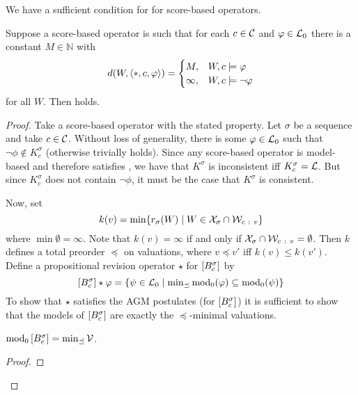 We have a sufficient condition for \agm{} for score-based operators.

\begin{lemma}
    \label{lemma:score_based_agm_sufficient_conditions}
    Suppose a score-based operator is such that for each $c \in \mathcal{C}$ and $\varphi
    \in \mathcal{L}{}_0$ there is a constant $M \in \mathbb{N}$ with
    \[
        d(W, \langle {\ast, c,  \varphi} \rangle)
        = \begin{cases}
            M,& W, c \models \varphi  \\
            \infty,& W, c \models \neg \varphi
        \end{cases}
    \]
    for all $W$. Then \agm{} holds.
\end{lemma}

\begin{proof}
    Take a score-based operator with the stated property. Let $\sigma$ be a
    sequence and take $c \in \mathcal{C}$. Without loss of generality, there is some
    $\varphi \in \mathcal{L}{}_0$ such that $\neg\phi \notin K^\sigma_c$ (otherwise \agm{}
    trivially holds). Since any score-based operator is model-based and
    therefore satisfies \closure{}, we have that $K^\sigma$ is inconsistent iff
    $K^\sigma_c = \mathcal{L}{}$. But since $K^\sigma_c$ does not contain $\neg\phi$,
    it must be the case that $K^\sigma$ is consistent.

    Now, set
    \[
        k(v)
        = \min\{
            r_\sigma(W)
            \mid
            W \in \mathcal{X}_\sigma \cap \mathcal{W}_{c\ :\ v}
        \}
    \]
    where $\min\emptyset =  \infty$. Note that $k(v) = \infty$ if and only if
    $\mathcal{X}_\sigma \cap \mathcal{W}_{c\ :\  v} = \emptyset$. Then $k$ defines a total
    preorder $\preceq$ on valuations, where $v \preceq v'$ iff $k(v) \le
    k(v')$. Define a propositional revision operator $\star$ for
    $\left[{B^\sigma_c}\right]$ by
    \[
        \left[{B^\sigma_c}\right] \star \varphi = \{
            \psi \in \mathcal{L}{}_0
            \mid
            \min\nolimits_{\preceq}{\operatorname{mod}_0(\varphi)} \subseteq \operatorname{mod}_0(\psi)
        \}
    \]
    To show that $\star$ satisfies the AGM postulates (for
    $\left[{B^\sigma_c}\right]$) it is sufficient to show that the models of
    $\left[{B^\sigma_c}\right]$ are exactly the $\preceq$-minimal valuations.

        \begin{claim}
            $\operatorname{mod}_0\left[{B^\sigma_c}\right] = \min_{\preceq}{\mathcal{V}}$.
        \end{claim}
        \begin{proof}


\end{proof}
\end{proof}

